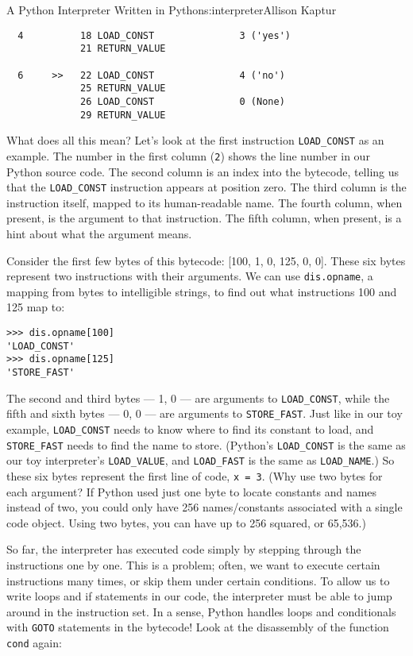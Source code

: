 \begin{aosachapter}{A Python Interpreter Written in Python}{s:interpreter}{Allison Kaptur}
\begin{verbatim}
  4          18 LOAD_CONST               3 ('yes')
             21 RETURN_VALUE

  6     >>   22 LOAD_CONST               4 ('no')
             25 RETURN_VALUE
             26 LOAD_CONST               0 (None)
             29 RETURN_VALUE
\end{verbatim}

What does all this mean? Let's look at the first instruction
\texttt{LOAD\_CONST} as an example. The number in the first column
(\texttt{2}) shows the line number in our Python source code. The second
column is an index into the bytecode, telling us that the
\texttt{LOAD\_CONST} instruction appears at position zero. The third
column is the instruction itself, mapped to its human-readable name. The
fourth column, when present, is the argument to that instruction. The
fifth column, when present, is a hint about what the argument means.

Consider the first few bytes of this bytecode: {[}100, 1, 0, 125, 0,
0{]}. These six bytes represent two instructions with their arguments.
We can use \texttt{dis.opname}, a mapping from bytes to intelligible
strings, to find out what instructions 100 and 125 map to:

\begin{verbatim}
>>> dis.opname[100]
'LOAD_CONST'
>>> dis.opname[125]
'STORE_FAST'
\end{verbatim}

The second and third bytes --- 1, 0 --- are arguments to
\texttt{LOAD\_CONST}, while the fifth and sixth bytes --- 0, 0 --- are
arguments to \texttt{STORE\_FAST}. Just like in our toy example,
\texttt{LOAD\_CONST} needs to know where to find its constant to load,
and \texttt{STORE\_FAST} needs to find the name to store. (Python's
\texttt{LOAD\_CONST} is the same as our toy interpreter's
\texttt{LOAD\_VALUE}, and \texttt{LOAD\_FAST} is the same as
\texttt{LOAD\_NAME}.) So these six bytes represent the first line of
code, \texttt{x = 3}. (Why use two bytes for each argument? If Python
used just one byte to locate constants and names instead of two, you
could only have 256 names/constants associated with a single code
object. Using two bytes, you can have up to 256 squared, or 65,536.)

\label{conditionals-and-loops}

So far, the interpreter has executed code simply by stepping through the
instructions one by one. This is a problem; often, we want to execute
certain instructions many times, or skip them under certain conditions.
To allow us to write loops and if statements in our code, the
interpreter must be able to jump around in the instruction set. In a
sense, Python handles loops and conditionals with \texttt{GOTO}
statements in the bytecode! Look at the disassembly of the function
\texttt{cond} again:


\end{aosachapter}
